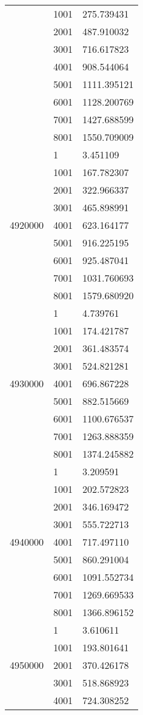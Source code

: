 \begin{table}[htb!]
\begin{tabular}{lll}
 & 1001 & 275.739431 \\
 & 2001 & 487.910032 \\
 & 3001 & 716.617823 \\
 & 4001 & 908.544064 \\
 & 5001 & 1111.395121 \\
 & 6001 & 1128.200769 \\
 & 7001 & 1427.688599 \\
 & 8001 & 1550.709009 \\
\multirow[c]{9}{*}{4920000} & 1 & 3.451109 \\
 & 1001 & 167.782307 \\
 & 2001 & 322.966337 \\
 & 3001 & 465.898991 \\
 & 4001 & 623.164177 \\
 & 5001 & 916.225195 \\
 & 6001 & 925.487041 \\
 & 7001 & 1031.760693 \\
 & 8001 & 1579.680920 \\
\multirow[c]{9}{*}{4930000} & 1 & 4.739761 \\
 & 1001 & 174.421787 \\
 & 2001 & 361.483574 \\
 & 3001 & 524.821281 \\
 & 4001 & 696.867228 \\
 & 5001 & 882.515669 \\
 & 6001 & 1100.676537 \\
 & 7001 & 1263.888359 \\
 & 8001 & 1374.245882 \\
\multirow[c]{9}{*}{4940000} & 1 & 3.209591 \\
 & 1001 & 202.572823 \\
 & 2001 & 346.169472 \\
 & 3001 & 555.722713 \\
 & 4001 & 717.497110 \\
 & 5001 & 860.291004 \\
 & 6001 & 1091.552734 \\
 & 7001 & 1269.669533 \\
 & 8001 & 1366.896152 \\
\multirow[c]{9}{*}{4950000} & 1 & 3.610611 \\
 & 1001 & 193.801641 \\
 & 2001 & 370.426178 \\
 & 3001 & 518.868923 \\
 & 4001 & 724.308252 \\

\end{tabular}
\end{table}
